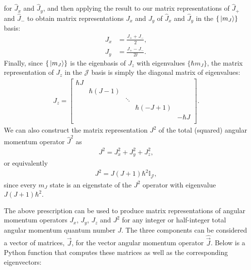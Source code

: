 for $\hat J_x$ and $\hat J_y$, and then applying the result to our matrix representations of $\hat J_+$ and $\hat J_-$ to obtain matrix representations $J_x$ and $J_y$ of $\hat J_x$ and $\hat J_y$ in the $\{\ket{m_J}\}$ basis:
\begin{align}
J_x &= \frac{J_+ + J_-}{2},\\
J_y &= \frac{J_+ - J_-}{2\ii}.
\end{align}
Finally, since $\{\ket{m_J}\}$ is the eigenbasis of $J_z$ with eigenvalues $\{\hbar m_J\}$, the matrix representation of $J_z$ in the $\mathcal{J}$ basis is simply the diagonal matrix of eigenvalues:
\begin{align}
J_z = \left[\begin{smallmatrix}
\hbar J\\
& \hbar (J - 1)\\
& & \ddots\\
& & & \hbar (- J + 1)\\
& & & & -\hbar J\\
\end{smallmatrix} \right].
\end{align} 
We can also construct the matrix representation $J^2$ of the total (squared) angular momentum operator $\hat J^2$ as
\begin{align}
J^2 = J_x^2 + J_y^2 + J_z^2, 
\end{align} 
or equivalently
\begin{align}
J^2 = J(J+1)\hbar^2 \mathbb{I}_{\mathcal{J}},
\end{align}
since every $m_J$ state is an eigenstate of the $J^2$ operator with eigenvalue $J(J+1)\hbar^2$.

The above prescription can be used to produce matrix representations of angular momentum operators $J_x$, $J_y$, $J_z$ and $J^2$ for any integer or half-integer total angular momentum quantum number $J$. The three components can be considered a vector of matrices, $\vec J$, for the vector angular momentum operator $\hat {\vec J}$. Below is a Python function that computes these matrices as well as the corresponding eigenvectors:


